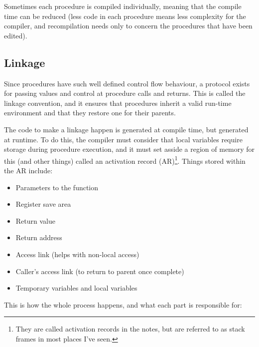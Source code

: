 Sometimes each procedure is compiled individually, meaning that the
compile time can be reduced (less code in each procedure means less
complexity for the compiler, and recompilation needs only to concern
the procedures that have been edited).

\subsection{Linkage}

Since procedures have such well defined control flow behaviour, a
protocol exists for passing values and control at procedure calls and
returns. This is called the linkage convention, and it ensures that
procedures inherit a valid run-time environment and that they restore
one for their parents.

The code to make a linkage happen is generated at compile time, but
generated at runtime. To do this, the compiler must consider that
local variables require storage during procedure execution, and it
must set asside a region of memory for this (and other things) called
an activation record (AR)\footnote{They are called activation records
in the notes, but are referred to as stack frames in most places I've
seen.}. Things stored within the AR include:

\begin{itemize}
\item Parameters to the function
\item Register save area
\item Return value
\item Return address
\item Access link (helps with non-local access)
\item Caller's access link (to return to parent once complete)
\item Temporary variables and local variables
\end{itemize}

This is how the whole process happens, and what each part is responsible for:

